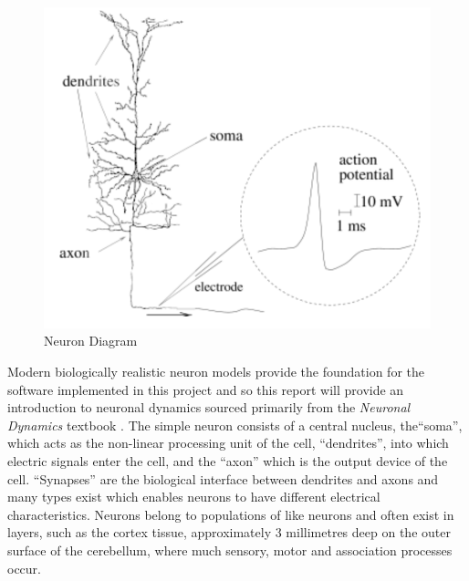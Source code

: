 \documentclass[11pt, twocolumn]{article}
\begin{document}
\begin{figure}[H]
	\centering
	\includegraphics[width=\linewidth]{neuron_diagram}
	\caption{Neuron Diagram \cite{gerstner2014neuronal}}
	\label{fig:neuron_diagram}
\end{figure}

Modern biologically realistic neuron models provide the foundation for the software implemented in this project and so this report will provide an introduction to neuronal dynamics sourced primarily from the \textit{Neuronal Dynamics} textbook \cite{gerstner2014neuronal}. The simple neuron consists of a central nucleus, the``soma'', which acts as the non-linear processing unit of the cell, ``dendrites'', into which electric signals enter the cell, and the ``axon'' which is the output device of the cell. ``Synapses'' are the biological interface between dendrites and axons and many types exist which enables neurons to have different electrical characteristics. Neurons belong to populations of like neurons and often exist in layers, such as the cortex tissue, approximately 3 millimetres deep on the outer surface of the cerebellum, where much sensory, motor and association processes occur.
\end{document}
